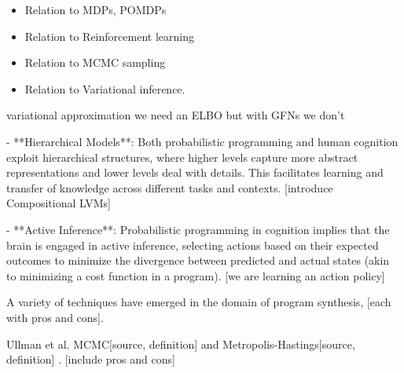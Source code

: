 \begin{itemize}
    \item Relation to MDPs, POMDPs
    \item Relation to Reinforcement learning
    \item Relation to MCMC sampling
    \item Relation to Variational inference. 
\end{itemize}


variational approximation we need an ELBO but with GFNs we don't 









- **Hierarchical Models**: Both probabilistic programming and human cognition exploit hierarchical structures, where higher levels capture more abstract representations and lower levels deal with details. This facilitates learning and transfer of knowledge across different tasks and contexts. [introduce Compositional LVMs]

- **Active Inference**: Probabilistic programming in cognition implies that the brain is engaged in active inference, selecting actions based on their expected outcomes to minimize the divergence between predicted and actual states (akin to minimizing a cost function in a program). [we are learning an action policy]












A variety of techniques have emerged in the domain of program synthesis, [each with pros and cons].

Ullman et al. MCMC[source, definition] and Metropolis-Hastings[source, definition] \cite{ullman_theory_2012}. [include pros and cons]




